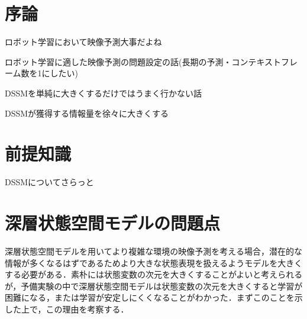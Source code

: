 \documentclass[10pt, twocolumn]{jarticle}
\begin{document}
%


\section{序論}
ロボット学習において映像予測大事だよね

ロボット学習に適した映像予測の問題設定の話(長期の予測・コンテキストフレーム数を1にしたい)

DSSMを単純に大きくするだけではうまく行かない話

DSSMが獲得する情報量を徐々に大きくする

\section{前提知識}
DSSMについてさらっと

\section{深層状態空間モデルの問題点}
深層状態空間モデルを用いてより複雑な環境の映像予測を考える場合，潜在的な情報が多くなるはずであるためより大きな状態表現を扱えるようモデルを大きくする必要がある．素朴には状態変数の次元を大きくすることがよいと考えられるが，予備実験の中で深層状態空間モデルは状態変数の次元を大きくすると学習が困難になる，または学習が安定しにくくなることがわかった．まずこのことを示した上で，この理由を考察する．
\end{document}
